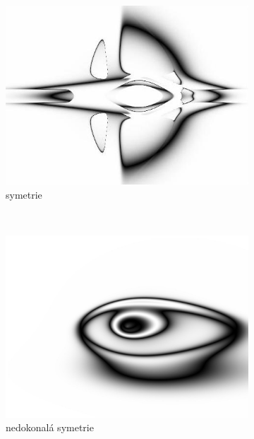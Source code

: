 \documentclass[a4]{article}
\begin{document}
\begin{figure}[b]
    \centering
    \begin{subfigure}[b]{0.3\textwidth}
        \includegraphics[width=\textwidth]{cppn1}
        \caption{symetrie}
        \label{fig:sym}
    \end{subfigure}
    ~ 
    \begin{subfigure}[b]{0.3\textwidth}
        \includegraphics[width=\textwidth]{cppn2}
        \caption{nedokonalá symetrie}
        \label{fig:imperfectsym}
    \end{subfigure}
    ~ 
    \begin{subfigure}[b]{0.3\textwidth}

\end{subfigure}
\end{figure}
\end{document}
